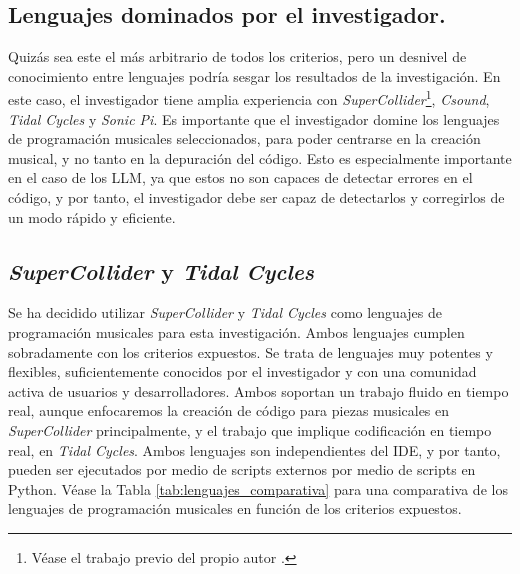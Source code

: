 \subsection{Lenguajes dominados por el investigador.} 
Quizás sea este el más arbitrario de todos los criterios, pero un desnivel de conocimiento entre lenguajes podría sesgar los resultados de la investigación. En este caso, el investigador tiene amplia experiencia con \textit{SuperCollider}\footnote{Véase el trabajo previo del propio autor \citep{guerraparraMesjetiuTFM_Arte_Sonoro_MEMORIA2020}.}, \textit{Csound}, \textit{Tidal Cycles} y \textit{Sonic Pi}.
Es importante que el investigador domine los lenguajes de programación musicales seleccionados, para poder centrarse en la creación musical, y no tanto en la depuración del código. Esto es especialmente importante en el caso de los LLM, ya que estos no son capaces de detectar errores en el código, y por tanto, el investigador debe ser capaz de detectarlos y corregirlos de un modo rápido y eficiente.

\subsection{\textit{SuperCollider} y \textit{Tidal Cycles}}
Se ha decidido utilizar \textit{SuperCollider} y \textit{Tidal Cycles} como lenguajes de programación musicales para esta investigación. Ambos lenguajes cumplen sobradamente con los criterios expuestos. Se trata de lenguajes muy potentes y flexibles, suficientemente conocidos por el investigador y con una comunidad activa de usuarios y desarrolladores. Ambos soportan un trabajo fluido en tiempo real, aunque enfocaremos la creación de código para piezas musicales en \textit{SuperCollider} principalmente, y el trabajo que implique codificación en tiempo real, en \textit{Tidal Cycles}. Ambos lenguajes son independientes del IDE, y por tanto, pueden ser ejecutados por medio de scripts externos por medio de scripts en Python. Véase la Tabla \ref{tab:lenguajes_comparativa} para una comparativa de los lenguajes de programación musicales en función de los criterios expuestos.

